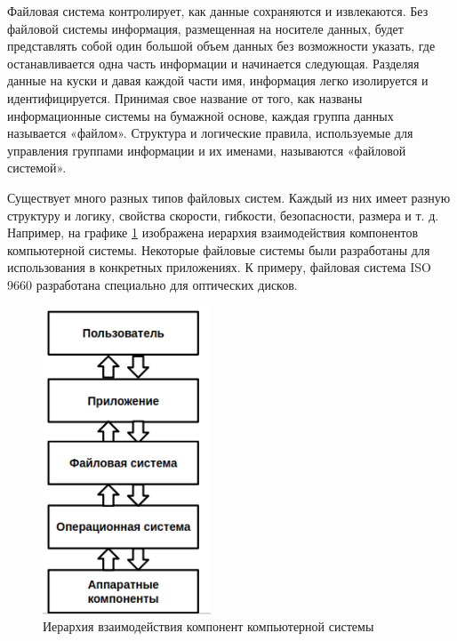 \par 
Файловая система контролирует, как данные сохраняются и извлекаются. Без файловой системы информация, размещенная на носителе данных, будет представлять собой один большой объем данных без возможности указать, где останавливается одна часть информации и начинается следующая. Разделяя данные на куски и давая каждой части имя, информация легко изолируется и идентифицируется. Принимая свое название от того, как названы информационные системы на бумажной основе, каждая группа данных называется «файлом». Структура и логические правила, используемые для управления группами информации и их именами, называются «файловой системой».
\par 
Существует много разных типов файловых систем. Каждый из них имеет разную структуру и логику, свойства скорости, гибкости, безопасности, размера и т. д. Например, на графике \ref{fig:fsystem} изображена иерархия взаимодействия компонентов компьютерной системы. Некоторые файловые системы были разработаны для использования в конкретных приложениях. К примеру, файловая система ISO 9660 разработана специально для оптических дисков. 

\begin{figure}[!ht]
\centering
\includegraphics[width=5cm]{Kenenbek/images/fsystem.png}
\caption{Иерархия взаимодействия компонент компьютерной системы}
\label{fig:fsystem}
\end{figure}

